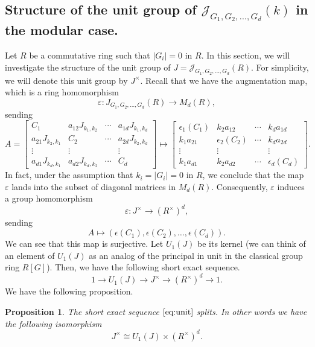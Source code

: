 \documentclass[12pt, a4paper]{amsart}
\numberwithin{equation}{section} %
\theoremstyle{plain}
\theoremstyle{definition}
\theoremstyle{plain}
\newtheorem{prop}[thm]{Proposition}
\theoremstyle{remark}
\newcommand{\sJ}{\mathcal{J}}
\begin{document}
\subsection{Structure of the unit group of $\sJ_{G_1, G_2, \ldots, G_d}(k)$ in the modular case.} 
Let $R$ be a commutative ring such that $|G_i|=0$ in $R.$ In this section, we will investigate the structure of the unit group of $J= \sJ_{G_1, G_2, \ldots, G_d}(R).$  For simplicity, we will denote this unit group by $J^{\times}$. Recall that we have the augmentation map, which is a ring homomorphism 
\[ \varepsilon: J_{G_1, G_2, \ldots, G_d}(R) \to M_d(R) ,\]
sending 
\[A=\begin{bmatrix} 
C_1&a_{12} J_{k_1,k_2} &\cdots & a_{1d}J_{k_1,k_d}\\
a_{21}J_{k_2,k_1} &C_2 &\cdots & a_{2d}J_{k_2,k_d}\\
\vdots&\vdots& &\vdots\\
a_{d1}J_{k_d,k_1}&a_{d2}J_{k_d,k_2}&\cdots& C_d
\end{bmatrix} \mapsto \begin{bmatrix} 
\epsilon_1(C_1)&k_2a_{12} &\cdots & k_da_{1d}\\
k_1a_{21} &\epsilon_2(C_2) &\cdots & k_da_{2d}\\
\vdots&\vdots& &\vdots\\
k_1a_{d1}&k_2a_{d2}&\cdots& \epsilon_d(C_d)
\end{bmatrix}.
\]
In fact, under the assumption that $k_i=|G_i|=0$ in $R$, we conclude that the map $\varepsilon$ lands into the subset of diagonal matrices in $M_d(R).$ Consequently, $\varepsilon$ induces a group homomorphism 
\[ \varepsilon: J^{\times} \to (R^{\times})^d ,\]
sending 
\[ A \mapsto (\epsilon(C_1), \epsilon(C_2), \ldots, \epsilon(C_d)) .\] 
We can see that this map is surjective. Let $U_1(J)$ be its kernel (we can think of an element of $U_1(J)$ as an analog of the principal in unit in the classical group ring $R[G]$). Then, we have the following short exact sequence. 
\begin{equation} \label{eq:unit}
1 \to U_1(J) \to J^{\times} \to (R^{\times})^d \to 1. 
\end{equation}
We have the following proposition. 
\begin{prop} \label{prop:unit_decomposition}
The short exact sequence $\ref{eq:unit}$ splits. In other words
we have the following isomorphism 
\[ J^{\times} \cong U_1(J) \times (R^{\times})^d .\] 
\end{prop}
\end{document}
